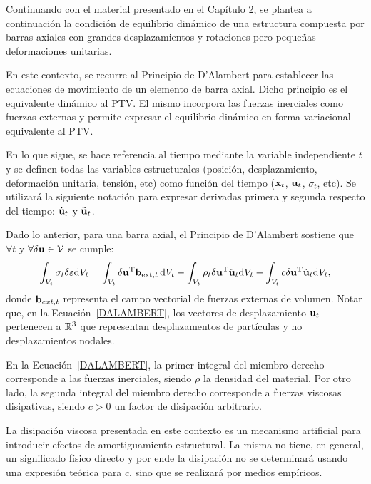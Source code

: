 Continuando con el material presentado en el Capítulo 2, se plantea a continuación la condición de equilibrio dinámico de una estructura compuesta por barras axiales con grandes desplazamientos y rotaciones pero pequeñas deformaciones unitarias.

En este contexto, se recurre al Principio de D'Alambert para establecer las ecuaciones de movimiento de un elemento de barra axial. Dicho principio es el equivalente dinámico al PTV. El mismo incorpora las fuerzas inerciales como fuerzas externas y permite expresar el equilibrio dinámico en forma variacional equivalente al PTV.

En lo que sigue, se hace referencia al tiempo mediante la variable independiente $t$ y se definen todas las variables estructurales (posición, desplazamiento, deformación unitaria, tensión, etc) como función del tiempo (${\bf x}_t$, ${\bf u}_t$, $\sigma_t$, etc). %
%
Se utilizará la siguiente notación para expresar derivadas primera y segunda respecto del tiempo: $\dot{{\bf u}}_t$ y $\ddot{{\bf u}}_t$.

Dado lo anterior, para una barra axial, el Principio de D'Alambert sostiene que $\forall t$ y $\forall \delta {\bf u} \in {\mathcal V}$ se cumple:
%
\begin{equation}\label{DALAMBERT}
	\int_{V_t} \sigma_t \delta \varepsilon {\text{d}} V_t 
	= \int_{V_t}  \delta {\bf u}^\text{T} {\bf b}_{\text{ext},t} \, {\text{d}} V_t  - \int_{V_t} \rho_t \delta {\bf u}^\text{T} \ddot{{\bf u}}_t  {\text{d}} V_t - \int_{V_t} c \delta {\bf u}^\text{T} \dot{{\bf u}}_t  {\text{d}} V_t,
\end{equation}
%
donde ${\bf b}_{ext,t}$ representa el campo vectorial de fuerzas externas de volumen. %
%
Notar que, en la Ecuación~\eqref{DALAMBERT}, los vectores de desplazamiento ${\bf u}_t$ pertenecen a ${\mathbb R}^3$ que representan desplazamentos de partículas y no desplazamientos nodales.
 
En la Ecuación~\eqref{DALAMBERT}, la primer integral del miembro derecho corresponde a las fuerzas inerciales, siendo $\rho$ la densidad del material. Por otro lado, la segunda integral del miembro derecho corresponde a fuerzas viscosas disipativas, siendo $c>0$ un factor de disipación arbitrario.


La disipación viscosa presentada en este contexto es un mecanismo artificial para introducir efectos de amortiguamiento estructural. %
%
La misma no tiene, en general, un significado físico directo y por ende la disipación no se determinará usando una expresión teórica para $c$, sino que se realizará por medios empíricos. %

